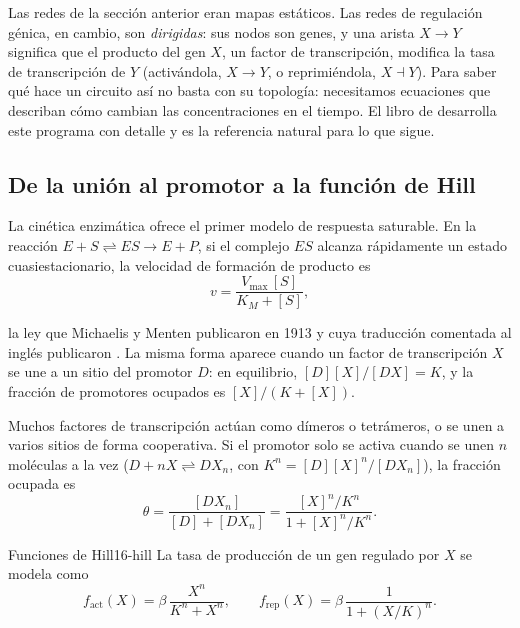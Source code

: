 Las redes de la sección anterior eran mapas estáticos. Las redes de regulación génica, en cambio, son \emph{dirigidas}: sus nodos son genes, y una arista $X\to Y$ significa que el producto del gen $X$, un factor de transcripción, modifica la tasa de transcripción de $Y$ (activándola, $X\to Y$, o reprimiéndola, $X\dashv Y$). Para saber qué hace un circuito así no basta con su topología: necesitamos ecuaciones que describan cómo cambian las concentraciones en el tiempo. El libro de \textcite{c16-alon2019} desarrolla este programa con detalle y es la referencia natural para lo que sigue.

\subsection{De la unión al promotor a la función de Hill}

La cinética enzimática ofrece el primer modelo de respuesta saturable. En la reacción $E+S\rightleftharpoons ES\to E+P$, si el complejo $ES$ alcanza rápidamente un estado cuasiestacionario, la velocidad de formación de producto es
\begin{equation}\label{eq:16-mm}
v=\frac{V_{\max}\,[S]}{K_M+[S]},
\end{equation}
\begin{simbolos}
\end{simbolos}
la ley que Michaelis y Menten publicaron en 1913 y cuya traducción comentada al inglés publicaron \textcite{c16-johnson2011}. La misma forma aparece cuando un factor de transcripción $X$ se une a un sitio del promotor $D$: en equilibrio, $[D][X]/[DX]=K$, y la fracción de promotores ocupados es $[X]/(K+[X])$.

Muchos factores de transcripción actúan como dímeros o tetrámeros, o se unen a varios sitios de forma cooperativa. Si el promotor solo se activa cuando se unen $n$ moléculas a la vez ($D+nX\rightleftharpoons DX_n$, con $K^n=[D][X]^n/[DX_n]$), la fracción ocupada es
\[
\theta=\frac{[DX_n]}{[D]+[DX_n]}=\frac{[X]^n/K^n}{1+[X]^n/K^n}.
\]

\begin{definicion}{Funciones de Hill}{16-hill}
La tasa de producción de un gen regulado por $X$ se modela como
\begin{equation}\label{eq:16-hill}
f_{\text{act}}(X)=\beta\,\frac{X^n}{K^n+X^n},\qquad
f_{\text{rep}}(X)=\beta\,\frac{1}{1+(X/K)^n}.
\end{equation}
\end{definicion}
\begin{simbolos}
\end{simbolos}

